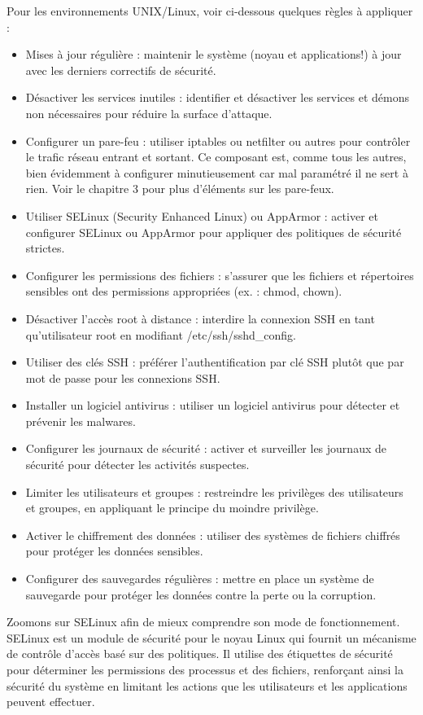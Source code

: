 Pour les environnements UNIX/Linux, voir ci-dessous quelques règles à appliquer : 
\begin{itemize}
    \item Mises à jour régulière : maintenir le système (noyau et applications!) à jour avec les derniers correctifs de sécurité.
    \item Désactiver les services inutiles : identifier et désactiver les services et démons non nécessaires pour réduire la surface d'attaque.
    \item Configurer un pare-feu : utiliser iptables ou netfilter ou autres pour contrôler le trafic réseau entrant et sortant. Ce composant est, comme tous les autres, bien évidemment à configurer minutieusement car mal paramétré il ne sert à rien. Voir le chapitre 3 pour plus d'éléments sur les pare-feux. 
    \item Utiliser SELinux (Security Enhanced Linux) ou AppArmor : activer et configurer SELinux ou AppArmor pour appliquer des politiques de sécurité strictes.
    \item Configurer les permissions des fichiers : s'assurer que les fichiers et répertoires sensibles ont des permissions appropriées (ex. : chmod, chown).
    \item Désactiver l'accès root à distance : interdire la connexion SSH en tant qu'utilisateur root en modifiant /etc/ssh/sshd_config.
    \item Utiliser des clés SSH : préférer l'authentification par clé SSH plutôt que par mot de passe pour les connexions SSH.
    \item Installer un logiciel antivirus : utiliser un logiciel antivirus pour détecter et prévenir les malwares.
    \item Configurer les journaux de sécurité : activer et surveiller les journaux de sécurité pour détecter les activités suspectes.
    \item Limiter les utilisateurs et groupes : restreindre les privilèges des utilisateurs et groupes, en appliquant le principe du moindre privilège.
    \item Activer le chiffrement des données : utiliser des systèmes de fichiers chiffrés pour protéger les données sensibles.
    \item Configurer des sauvegardes régulières : mettre en place un système de sauvegarde pour protéger les données contre la perte ou la corruption.
\end{itemize}

Zoomons sur SELinux afin de mieux comprendre son mode de fonctionnement. SELinux est un module de sécurité pour le noyau Linux qui fournit un mécanisme de contrôle d'accès basé sur des politiques. Il utilise des étiquettes de sécurité pour déterminer les permissions des processus et des fichiers, renforçant ainsi la sécurité du système en limitant les actions que les utilisateurs et les applications peuvent effectuer.


